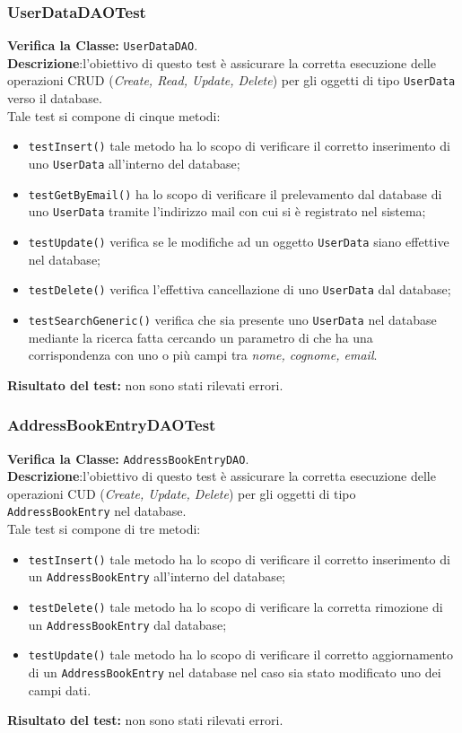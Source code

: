 \subsubsection{UserDataDAOTest}
\textbf{Verifica la Classe:} \texttt{UserDataDAO}.\\
\textbf{Descrizione}:l'obiettivo di questo test è assicurare la corretta esecuzione delle operazioni CRUD (\textit{Create, Read, Update, Delete}) per gli oggetti di tipo \texttt{UserData} verso il database. \\
Tale test si compone di cinque metodi:
\begin{itemize}
\item \texttt{testInsert()} tale metodo ha lo scopo di verificare il corretto inserimento di uno \texttt{UserData} all'interno del database;
\item \texttt{testGetByEmail()} ha lo scopo di verificare il prelevamento dal database di uno \texttt{UserData} tramite l'indirizzo mail con cui si è registrato nel sistema;
\item \texttt{testUpdate()} verifica se le modifiche ad un oggetto \texttt{UserData} siano effettive nel database;
\item \texttt{testDelete()} verifica l'effettiva cancellazione di uno \texttt{UserData} dal database;
\item \texttt{testSearchGeneric()} verifica che sia presente uno \texttt{UserData} nel database mediante la ricerca fatta cercando un parametro di  che ha una corrispondenza con uno o più campi tra \textit{nome, cognome, email}.
\end{itemize}
\textbf{Risultato del test:} non sono stati rilevati errori.


\subsubsection{AddressBookEntryDAOTest}
\textbf{Verifica la Classe:} \texttt{AddressBookEntryDAO}.\\
\textbf{Descrizione}:l'obiettivo di questo test è assicurare la corretta esecuzione delle operazioni CUD (\textit{Create, Update, Delete}) per gli oggetti di tipo \texttt{AddressBookEntry} nel database. \\
Tale test si compone di tre metodi:
\begin{itemize}
\item \texttt{testInsert()} tale metodo ha lo scopo di verificare il corretto inserimento di un \texttt{AddressBookEntry} all'interno del database;
\item \texttt{testDelete()} tale metodo ha lo scopo di verificare la corretta rimozione di un \texttt{AddressBookEntry} dal database;
\item \texttt{testUpdate()} tale metodo ha lo scopo di verificare il corretto aggiornamento di un \texttt{AddressBookEntry} nel database nel caso sia stato modificato uno dei campi dati.

\end{itemize}
\textbf{Risultato del test:} non sono stati rilevati errori.


